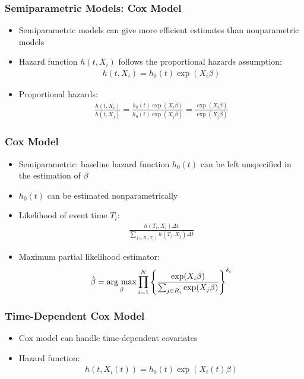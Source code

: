 \documentclass[aspectratio=169, 12pt]{beamer}
\newcommand{\argmax}{\mathop{\rm arg~max}\limits}
\begin{document}
	\begin{frame}
	\frametitle{Semiparametric Models: Cox Model}
	\begin{itemize}
	\item Semiparametric models can give more efficient estimates than nonparametric models
	\item Hazard function $h(t,X_i)$ follows the proportional hazards assumption:
	\begin{eqnarray*}
	h(t,X_i) = h_0(t) \exp(X_i \beta)
	\end{eqnarray*}
	\item Proportional hazards:
	\begin{eqnarray*}
	\frac{h(t,X_i)}{h(t,X_j)} = \frac{h_0(t) \exp(X_i \beta)}{h_0(t) \exp(X_j \beta)} = \frac{\exp(X_i \beta)}{\exp(X_j \beta)}
	\end{eqnarray*}

	\end{itemize}

	\end{frame}

	\begin{frame}
	\frametitle{Cox Model}
	\begin{itemize}
	\item Semiparametric: baseline hazard function $h_0(t)$ can be left unspecified in the estimation of $\beta$
	\item $h_0(t)$ can be estimated nonparametrically
	\item Likelihood of event time $T_i$:
	\begin{eqnarray*}
	\frac{h(T_i,X_i) \Delta t}{\sum_{j \in R(T_i)} h(T_i,X_j) \Delta t}
	\end{eqnarray*}
	\item Maximum partial likelihood estimator:
	\begin{eqnarray*}
	\hat{\beta} = \argmax_{\beta} \prod_{i=1}^N \left\{\frac{\exp(X_i \beta)}{\sum_{j \in R_i} \exp(X_j \beta)} \right\}^{\delta_i}
	\end{eqnarray*}

	\end{itemize}

	\end{frame}

	\begin{frame}
	\frametitle{Time-Dependent Cox Model}
	\begin{itemize}
	\item Cox model can handle time-dependent covariates
	\item Hazard function:
	\begin{eqnarray*}
	h(t,X_i(t)) = h_0(t) \exp(X_i(t) \beta)
	\end{eqnarray*}

	\end{itemize}

	\end{frame}
\end{document}

